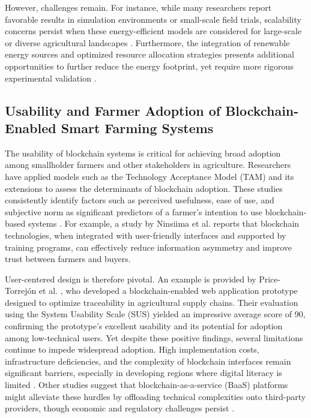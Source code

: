\documentclass[12pt,onecolumn]{IEEEtran} %
\begin{document}
However, challenges remain. For instance, while many researchers report favorable results in simulation environments or small-scale field trials, scalability concerns persist when these energy-efficient models are considered for large-scale or diverse agricultural landscapes \cite{akella2023asystematicreview, munaganuri2025designofan}. Furthermore, the integration of renewable energy sources and optimized resource allocation strategies presents additional opportunities to further reduce the energy footprint, yet require more rigorous experimental validation \cite{tahayur2024enhancingelectronicagriculture, mwewa2024blockchaintechnologya}.

\subsection{Usability and Farmer Adoption of Blockchain-Enabled Smart Farming Systems}
The usability of blockchain systems is critical for achieving broad adoption among smallholder farmers and other stakeholders in agriculture. Researchers have applied models such as the Technology Acceptance Model (TAM) and its extensions \cite{ninsiima2025determinantsofsmallholder, mwewa2024blockchaintechnologya} to assess the determinants of blockchain adoption. These studies consistently identify factors such as perceived usefulness, ease of use, and subjective norm as significant predictors of a farmer’s intention to use blockchain-based systems \cite{ninsiima2025determinantsofsmallholder, mwewa2024blockchaintechnologya}. For example, a study by Ninsiima et al. \cite{ninsiima2025determinantsofsmallholder} reports that blockchain technologies, when integrated with user-friendly interfaces and supported by training programs, can effectively reduce information asymmetry and improve trust between farmers and buyers.

User-centered design is therefore pivotal. An example is provided by Price-Torrejón et al. \cite{pricetorrejon2025designofa}, who developed a blockchain-enabled web application prototype designed to optimize traceability in agricultural supply chains. Their evaluation using the System Usability Scale (SUS) yielded an impressive average score of 90, confirming the prototype’s excellent usability and its potential for adoption among low-technical users. Yet despite these positive findings, several limitations continue to impede widespread adoption. High implementation costs, infrastructure deficiencies, and the complexity of blockchain interfaces remain significant barriers, especially in developing regions where digital literacy is limited \cite{ninsiima2025determinantsofsmallholder, akella2023asystematicreview}. Other studies suggest that blockchain-as-a-service (BaaS) platforms might alleviate these hurdles by offloading technical complexities onto third-party providers, though economic and regulatory challenges persist \cite{akella2023asystematicreview}.
\end{document}
